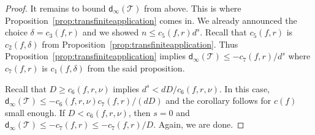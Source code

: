 \documentclass[12pt,oneside,a4]{amsart}
\newcommand{\cT}{\mathcal{T}}
\numberwithin{maincounter}{section}
\numberwithin{equation}{section}
\begin{document}
\begin{proof}
  It remains to bound $\mathsf{d}_\infty(\cT)$ from above. This is where   
  Proposition~\ref{prop:transfiniteapplication} comes in. We already
  announced the choice 
  $\delta = c_3(f,r)$
  and we showed  $n\le c_5(f,r)d^s$. Recall that
  $c_5(f,r)$ is $c_2(f,\delta)$ from Proposition~\ref{prop:transfiniteapplication}.
  Thus Proposition~\ref{prop:transfiniteapplication}
  implies $\mathsf{d}_\infty(\cT)\le -c_7(f,r)/d^s$
  where $c_7(f,r)$ is $c_1(f,\delta)$ from the said
  proposition.
  
  Recall that $D\ge c_6(f,r,\nu)$ implies $d^s
  <dD/c_6(f,r,\nu)$. In this case, $\mathsf{d}_\infty(\cT)\le
  -c_6(f,r,\nu)c_7(f,r)/(dD)$ and the corollary follows for
  $c(f)$ small enough. If $D<c_6(f,r,\nu)$, then $s=0$ and
  $\mathsf{d}_\infty(\cT)\le -c_7(f,r)\le -c_7(f,r)/D$. Again,
  we are done.  
\end{proof}
\end{document}
